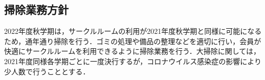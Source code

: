 \subsection*{掃除業務方針}


2022年度秋学期は，サークルルームの利用が2021年度秋学期と同様に可能になるため，通年通り掃除を行う．ゴミの処理や備品の整理などを適切に行い，会員が快適にサークルルームを利用できるように掃除業務を行う．大掃除に関しては，2021年度同様各学期ごとに一度決行するが，コロナウイルス感染症の影響により少人数で行うこととする．
